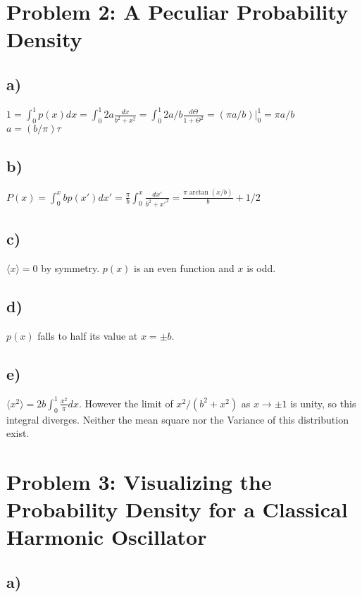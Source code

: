 \documentclass{article}
\begin{document}
\section{Problem 2: A Peculiar Probability Density}
\subsection{a)}
$1=\int_0^{1}p(x)dx=\int_0^{1}2a\frac{dx}{b^2+x^2}=\int_0^{1}2a/b\frac{d\Theta}{1+\Theta^2}=(\pi a/b)\vert_0^{1}=\pi a/b$ \\
$a=(b/\pi)\tau$
\subsection{b)}
$P(x)=\int_0^{x}bp(x')dx'=\frac{\pi}{b}\int_0^{x}\frac{dx'}{b^2+x'^2}=\frac{\pi\arctan(x/b)}{b}+1/2$
\subsection{c)}
$\langle x \rangle=0$ by symmetry. $p(x)$ is an even function and $x$ is odd. \\
\subsection{d)}
$p(x)$ falls to half its value at $x=\pm b$. \\
\subsection{e)}
$\langle x^2 \rangle=2b\int_0^{1}\frac{x^2}{\pi}dx$. However the limit of $x^2/(b^2+x^2)$ as $x\rightarrow\pm 1$ is unity, so this integral diverges. Neither the mean square nor the Variance of this distribution exist.

\section{Problem 3: Visualizing the Probability Density for a Classical Harmonic Oscillator}
\subsection{a)}
\end{document}
